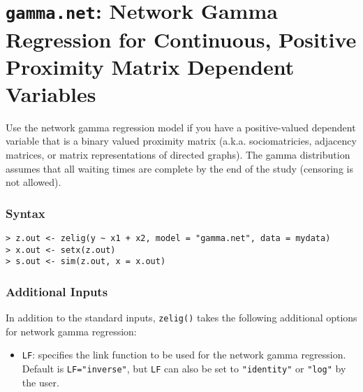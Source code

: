 \section{{\tt gamma.net}: Network Gamma Regression for Continuous, Positive Proximity Matrix Dependent Variables} 
 
Use the network gamma regression model if you have a positive-valued dependent variable that is a binary valued proximity matrix (a.k.a. sociomatricies, adjacency matrices, or matrix representations of directed graphs). The gamma distribution assumes that all waiting times are complete by the end of the study (censoring is not allowed). 
 
\subsubsection{Syntax} 
\begin{verbatim} 
> z.out <- zelig(y ~ x1 + x2, model = "gamma.net", data = mydata)  
> x.out <- setx(z.out) 
> s.out <- sim(z.out, x = x.out) 
\end{verbatim} 
 
\subsubsection{Additional Inputs} 
 
In addition to the standard inputs, {\tt zelig()} takes the following additional options for network gamma regression: 
 
\begin{itemize} 
\item {\tt LF}: specifies the link function to be used for the network gamma regression. Default is {\tt LF="inverse"}, but {\tt LF} can also be set to {\tt "identity"} or {\tt "log"} by the user. 
\end{itemize} 
 
